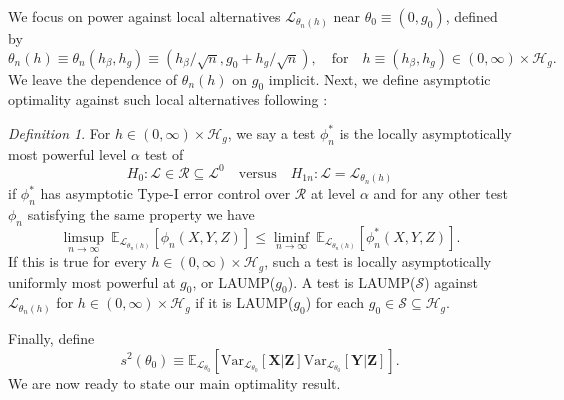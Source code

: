 \documentclass[aos]{imsart}
\theoremstyle{plain}
\theoremstyle{remark}
\newtheorem{definition}{Definition}
\newcommand{\E}{\mathbb E}								%
\newcommand{\V}{\mathrm{Var}}							%
\newcommand{\prx}{\bm X}								%
\newcommand{\srx}{X}									%
\newcommand{\prz}{\bm Z}								%
\newcommand{\srz}{Z}									%
\newcommand{\pry}{{\bm Y}}								%
\newcommand{\sry}{Y}									%
\newcommand{\law}{\mathcal L}							%
\newcommand{\nulllaws}{\mathscr L^0}					%
\newcommand{\regclass}{\mathscr R}					    %
\renewcommand{\H}{\mathcal H}		 					%
\begin{document}
We focus on power against local alternatives $\law_{\theta_n(h)}$ near $\theta_0 \equiv (0, g_0)$, defined by 
\begin{equation}
    \theta_n(h) \equiv \theta_n(h_\beta, h_g) \equiv (h_\beta/\sqrt n, g_0 + h_g/\sqrt n), \quad \text{for} \quad h \equiv (h_\beta, h_g) \in (0, \infty) \times \H_g.
    \label{eq:local-alternatives}
\end{equation}
We leave the dependence of $\theta_n(h)$ on $g_0$ implicit. Next, we define asymptotic optimality against such local alternatives following \citet{Choi1996}:
\begin{definition}
    For $h \in (0, \infty) \times \H_g$, we say a test $\phi^*_n$ is the locally asymptotically most powerful level $\alpha$ test of 
    \begin{equation}
        H_{0}: \law \in  \regclass\subseteq \nulllaws \quad \text{versus}  \quad H_{1n}: \law = \law_{\theta_n(h)}
        \label{eq:testing-problem}
    \end{equation}
    if $\phi^*_n$ has asymptotic Type-I error control over $ \regclass$ at level $\alpha$ and for any other test $\phi_n$ satisfying the same property we have
    \begin{equation}
        \limsup_{n \rightarrow \infty}\  \E_{\law_{\theta_n(h)}}[\phi_n(\srx, \sry, \srz)] \leq \liminf_{n \rightarrow \infty}\ \E_{\law_{\theta_n(h)}}[ \phi^{*}_n(\srx, \sry, \srz)].
        \label{eq:power-bound}
    \end{equation}
    If this is true for every $h \in (0, \infty) \times \H_g$, such a test is locally asymptotically uniformly most powerful at $g_0$, or LAUMP($g_0$). A test is LAUMP($\mathcal{S}$) against $\law_{\theta_n(h)}$ for $h \in (0, \infty) \times \H_g$ if it is LAUMP($g_0$) for each $g_0 \in\mathcal{S}\subseteq \H_g$.
    
\end{definition}

Finally, define 
\begin{equation}
    s^2(\theta_0) \equiv \E_{\law_{\theta_0}}[\V_{\law_{\theta_0}}[\prx|\prz]\V_{\law_{\theta_0}}[\pry|\prz]].
\end{equation}
We are now ready to state our main optimality result.
\end{document}
